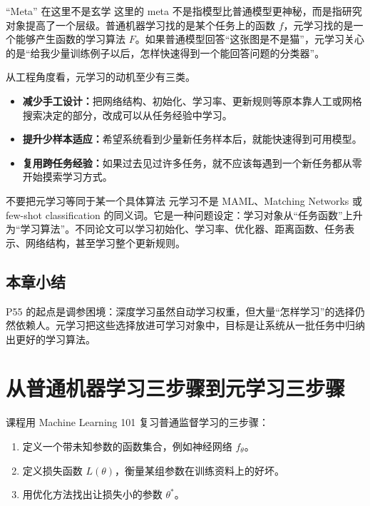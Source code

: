 \documentclass[a4paper]{article}
\begin{document}
\begin{knowledgebox}{“Meta” 在这里不是玄学}
    这里的 meta 不是指模型比普通模型更神秘，而是指研究对象提高了一个层级。普通机器学习找的是某个任务上的函数 $f$，元学习找的是一个能够产生函数的学习算法 $F$。如果普通模型回答“这张图是不是猫”，元学习关心的是“给我少量训练例子以后，怎样快速得到一个能回答问题的分类器”。
\end{knowledgebox}

从工程角度看，元学习的动机至少有三类。
\begin{itemize}
    \item \textbf{减少手工设计：}把网络结构、初始化、学习率、更新规则等原本靠人工或网格搜索决定的部分，改成可以从任务经验中学习。
    \item \textbf{提升少样本适应：}希望系统看到少量新任务样本后，就能快速得到可用模型。
    \item \textbf{复用跨任务经验：}如果过去见过许多任务，就不应该每遇到一个新任务都从零开始摸索学习方式。
\end{itemize}

\begin{warningbox}{不要把元学习等同于某一个具体算法}
    元学习不是 MAML、Matching Networks 或 few-shot classification 的同义词。它是一种问题设定：学习对象从“任务函数”上升为“学习算法”。不同论文可以学习初始化、学习率、优化器、距离函数、任务表示、网络结构，甚至学习整个更新规则。
\end{warningbox}

\subsection{本章小结}

P55 的起点是调参困境：深度学习虽然自动学习权重，但大量“怎样学习”的选择仍然依赖人。元学习把这些选择放进可学习对象中，目标是让系统从一批任务中归纳出更好的学习算法。

\section{从普通机器学习三步骤到元学习三步骤}

课程用 Machine Learning 101 复习普通监督学习的三步骤：
\begin{enumerate}
    \item 定义一个带未知参数的函数集合，例如神经网络 $f_{\theta}$。
    \item 定义损失函数 $L(\theta)$，衡量某组参数在训练资料上的好坏。
    \item 用优化方法找出让损失小的参数 $\theta^\ast$。
\end{enumerate}
\end{document}
